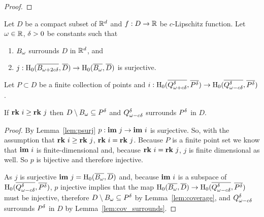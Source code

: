 \begin{proof}
\end{proof}

\begin{theorem}\label{thm:geo_tcc}
  Let $D$ be a compact subset of $\R^d$ and $f : D\to\R$ be $c$-Lipschitz function.
  Let $\omega\in\R$, $\of > 0$ be constants such that
  \begin{enumerate}[label=(\alph*)]
    \item $\B$ surrounds $D$ in $\R^d$, and
    \item $j : \hom_0(\cmp{\BB},\cmp{D})\to \hom_0(\cmp{\B}, \cmp{D})$ is surjective.
  \end{enumerate}
  Let $P\subset D$ be a finite collection of points and $i : \hom_0(\cmp{\QQ^\of}, \cmp{\P})\to \hom_0(\cmp{\Q^\of}, \cmp{\P})$.

  If $\rk~i\geq \rk~j$ then $D\setminus \B\subseteq \P$ and $\Q^\of$ surrounds $\P$ in $D$.
\end{theorem}
\begin{proof}
  By Lemma~\ref{lem:psurj} $p :\im~j\to \im~i$ is surjective.
  So, with the assumption that $\rk~i\geq \rk~j$, $\rk~i = \rk~j$.
  Because $P$ is a finite point set we know that $\im~i$ is finite-dimensional and, because $\rk~i = \rk~j$, $j$ is finite dimensional as well.
  So $p$ is bijective and therefore injective.

  As $j$ is surjective $\im~j = \hom_0(\cmp{\B}, \cmp{D})$ and, because $\im~i$ is a subspace of $\hom_0(\cmp{\Q^\of}, \cmp{\P})$, $p$ injective implies that the map $\hom_0(\cmp{\B}, \cmp{D})\to \hom_0(\cmp{\Q^\of}, \cmp{\P})$ must be injective, therefore $D\setminus\bb\subseteq \P$ by Lemma~\ref{lem:coverage}, and $\Q^\of$ surrounds $\P$ in $D$ by Lemma~\ref{lem:cov_surrounds}.
\end{proof}
